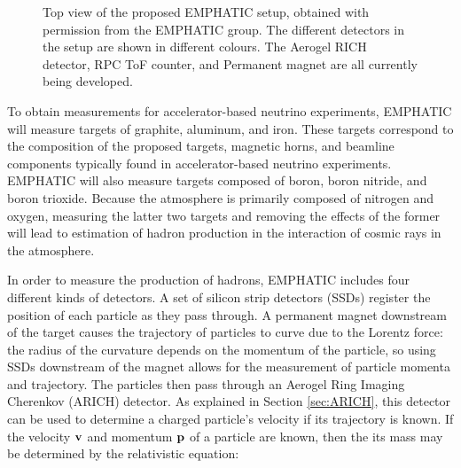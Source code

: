 \begin{figure}[] 
\centering
{}
\caption{Top view of the proposed EMPHATIC setup, obtained with permission from the EMPHATIC group. The different detectors in the setup are shown in different colours. The Aerogel RICH detector, RPC ToF counter, and Permanent magnet are all currently being developed.}

\label{fig:EMPHATIC}       %
\end{figure}

To obtain measurements for accelerator-based neutrino experiments, EMPHATIC will measure targets of graphite, aluminum, and iron. These targets correspond to the composition of the proposed targets, magnetic horns, and beamline components typically found in accelerator-based neutrino experiments. EMPHATIC will also measure targets composed of boron, boron nitride, and boron trioxide. Because the atmosphere is primarily composed of nitrogen and oxygen, measuring the latter two targets and removing the effects of the former will lead to estimation of hadron production in the interaction of cosmic rays in the atmosphere. 

In order to measure the production of hadrons, EMPHATIC includes four different kinds of detectors. A set of silicon strip detectors (SSDs) register the position of each particle as they pass through. A permanent magnet downstream of the target causes the trajectory of particles to curve due to the Lorentz force: the radius of the curvature depends on the momentum of the particle, so using SSDs downstream of the magnet allows for the measurement of particle momenta and trajectory. The particles then pass through an Aerogel Ring Imaging Cherenkov (ARICH) detector. As explained in Section \ref{sec:ARICH}, this detector can be used to determine a charged particle's velocity if its trajectory is known. If the velocity $\bf{v}$ and momentum $\bf{p}$ of a particle are known, then the its mass may be determined by the relativistic equation:


